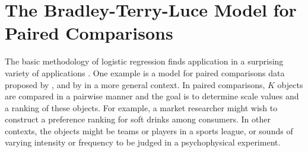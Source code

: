 \section{The Bradley-Terry-Luce Model for Paired Comparisons}\label{sec:logist-btl}
The basic methodology of logistic regression finds application in
a surprising variety of applications
\citep{Strauss:92}.
One example is a model for paired comparisons data proposed by
\citet{BradleyTerry:52}, and by \citet{Luce:59} in a more general context.
In paired comparisons, $K$ objects are compared in a pairwise manner
and the goal is to determine scale values and a ranking of these objects.
For example, a market researcher might wish to construct a preference ranking for
soft drinks among consumers.  In other contexts, the objects might be
teams or players in a sports league, or sounds of varying intensity
or frequency to be judged in a psychophysical experiment.

